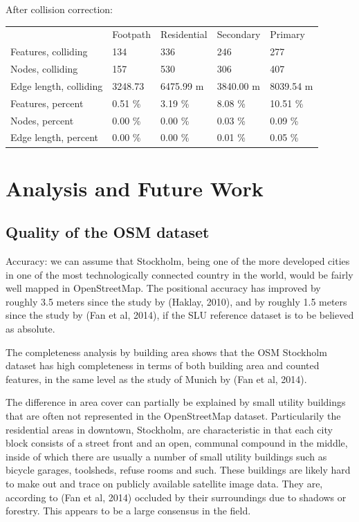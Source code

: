 \documentclass[a4paper]{article}
\begin{document}
After collision correction:

\begin{table}[H]
\begin{tabular}{lllll}
                            & Footpath      & Residential  & Secondary   & Primary     \\
    Features, colliding     & 134           & 336          & 246         & 277         \\
    Nodes, colliding        & 157           & 530          & 306         & 407         \\
    Edge length, colliding  & 3248.73       & 6475.99 m    & 3840.00 m   & 8039.54 m   \\
    Features, percent       & 0.51 \%       & 3.19 \%      & 8.08 \%     & 10.51 \%    \\
    Nodes, percent          & 0.00 \%       & 0.00 \%      & 0.03 \%     & 0.09 \%     \\
    Edge length, percent    & 0.00 \%       & 0.00 \%      & 0.01 \%     & 0.05 \%

\end{tabular}
\end{table}

\section{Analysis and Future Work}

\subsection{Quality of the OSM dataset}

Accuracy: we can assume that Stockholm, being one of the more developed cities in one of the most technologically connected country in the world, would be fairly well mapped in OpenStreetMap. The positional accuracy has improved by roughly 3.5 meters since the study by (Haklay, 2010), and by roughly 1.5 meters since the study by (Fan et al, 2014), if the SLU reference dataset is to be believed as absolute.

The completeness analysis by building area shows that the OSM Stockholm dataset has high completeness in terms of both building area and counted features, in the same level as the study of Munich by (Fan et al, 2014).

The difference in area cover can partially be explained by small utility buildings that are often not represented in the OpenStreetMap dataset. Particularily the residential areas in downtown, Stockholm, are characteristic in that each city block consists of a street front and an open, communal compound in the middle, inside of which there are usually a number of small utility buildings such as bicycle garages, toolsheds, refuse rooms and such. These buildings are likely hard to make out and trace on publicly available satellite image data. They are, according to (Fan et al, 2014) occluded by their surroundings due to shadows or forestry. This appears to be a large consensus in the field.
\end{document}
